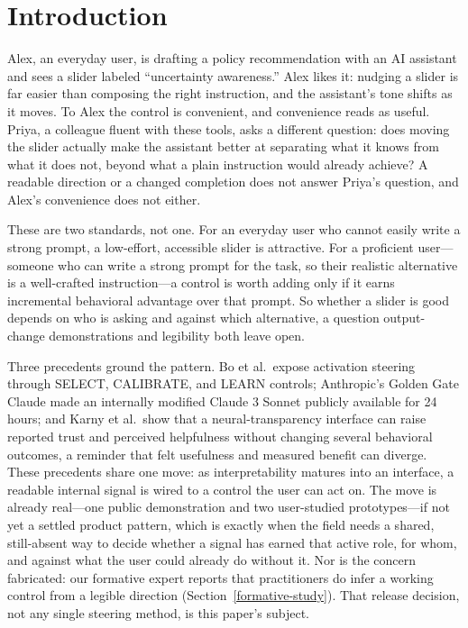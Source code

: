 \documentclass[manuscript,review,anonymous]{acmart}
\begin{document}

\maketitle



\section{Introduction}\label{introduction}

Alex, an everyday user, is drafting a policy recommendation with an AI assistant and sees a slider labeled ``uncertainty awareness.'' Alex likes it: nudging a slider is far easier than composing the right instruction, and the assistant's tone shifts as it moves. To Alex the control is convenient, and convenience reads as useful. Priya, a colleague fluent with these tools, asks a different question: does moving the slider actually make the assistant better at separating what it knows from what it does not, beyond what a plain instruction would already achieve? A readable direction or a changed completion does not answer Priya's question, and Alex's convenience does not either.

These are two standards, not one. For an everyday user who cannot easily write a strong prompt, a low-effort, accessible slider is attractive. For a proficient user---someone who can write a strong prompt for the task, so their realistic alternative is a well-crafted instruction---a control is worth adding only if it earns incremental behavioral advantage over that prompt. So whether a slider is good depends on who is asking and against which alternative, a question output-change demonstrations and legibility both leave open.

Three precedents ground the pattern. Bo et al.~expose activation steering through SELECT, CALIBRATE, and LEARN controls; Anthropic's Golden Gate Claude made an internally modified Claude 3 Sonnet publicly available for 24 hours; and Karny et al.~show that a neural-transparency interface can raise reported trust and perceived helpfulness without changing several behavioral outcomes, a reminder that felt usefulness and measured benefit can diverge. \cite{bo2026steerable,anthropic2024goldengate,karny2026neural} {}%
These precedents share one move: as interpretability matures into an interface, a readable internal signal is wired to a control the user can act on. The move is already real---one public demonstration and two user-studied prototypes---if not yet a settled product pattern, which is exactly when the field needs a shared, still-absent way to decide whether a signal has earned that active role, for whom, and against what the user could already do without it. Nor is the concern fabricated: our formative expert reports that practitioners do infer a working control from a legible direction (Section~\ref{formative-study}). That release decision, not any single steering method, is this paper's subject.
\end{document}
